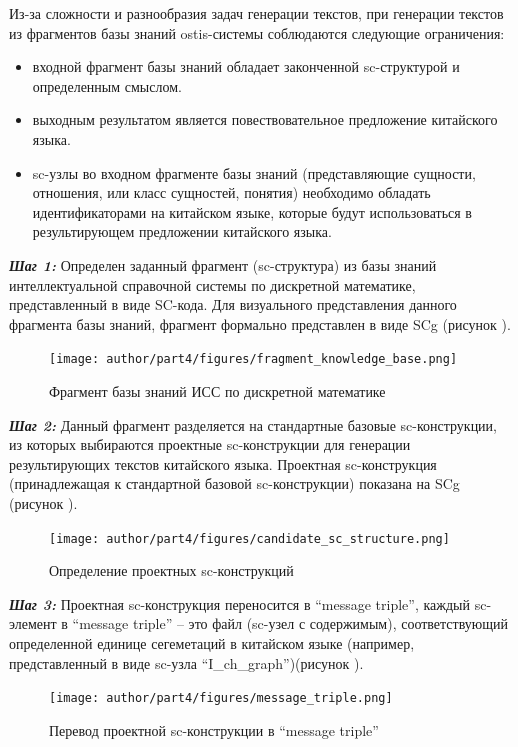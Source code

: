Из-за сложности и разнообразия задач генерации текстов, при генерации текстов из фрагментов базы знаний ostis-системы соблюдаются следующие ограничения:
\begin{itemize}
	\item входной фрагмент базы знаний обладает законченной sc-структурой и определенным смыслом.
	\item выходным результатом является повествовательное предложение китайского языка.
	\item sc-узлы во входном фрагменте базы знаний (представляющие сущности, отношения, или класс сущностей, понятия) необходимо обладать идентификаторами на китайском языке, которые будут использоваться в результирующем предложении китайского языка.
\end{itemize}

\textbf{\textit{Шаг 1:}} Определен заданный фрагмент (sc-структура) из базы знаний интеллектуальной справочной системы по дискретной математике, представленный в виде SC-кода. Для визуального представления данного фрагмента базы знаний, фрагмент формально представлен в виде SCg (рисунок \textit{}).
\begin{figure}[H]
	\centering
	\texttt{[image: author/part4/figures/fragment\_knowledge\_base.png]}
	\caption{Фрагмент базы знаний ИСС по дискретной математике}
	\label{fig:knowledge-base-fragment}
\end{figure}

\textbf{\textit{Шаг 2:}} Данный фрагмент разделяется на стандартные базовые sc-конструкции, из которых выбираются проектные sc-конструкции для генерации результирующих текстов китайского языка. Проектная sc-конструкция (принадлежащая к стандартной базовой sc-конструкции) показана на SCg (рисунок \textit{}).
\begin{figure}[H]
	\centering
	\texttt{[image: author/part4/figures/candidate\_sc\_structure.png]}
	\caption{Определение проектных sc-конструкций}
	\label{fig:candidate-sc-construction}
\end{figure}

\textbf{\textit{Шаг 3:}} Проектная sc-конструкция переносится в ``message triple'', каждый sc-элемент в ``message triple'' -- это файл (sc-узел с содержимым), соответствующий определенной единице сегеметаций в китайском языке (например, представленный в виде sc-узла ``I\_ch\_graph'')(рисунок \textit{}).
\begin{figure}[H]
	\centering
	\texttt{[image: author/part4/figures/message\_triple.png]}
	\caption{Перевод проектной sc-конструкции в ``message triple''}
	\label{fig:message-triple}
\end{figure}

